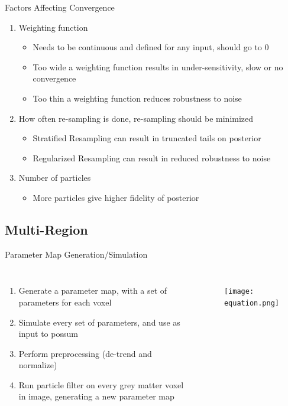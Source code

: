 \documentclass{beamer}
\begin{document}
\begin{frame}{Factors Affecting Convergence}
    \begin{enumerate}
        \item Weighting function
            \begin{itemize}
                \item Needs to be continuous and defined for any input, should go to 0
                \item Too wide a weighting function results in under-sensitivity, 
                            slow or no convergence
                \item Too thin a weighting function reduces robustness to noise
            \end{itemize}
        \item How often re-sampling is done, re-sampling should be minimized
            \begin{itemize}
                \item Stratified Resampling can result in truncated tails on posterior
                \item Regularized Resampling can result in reduced robustness to noise 
            \end{itemize}
        \item Number of particles
            \begin{itemize}
                \item More particles give higher fidelity of posterior
            \end{itemize}
    \end{enumerate}
\end{frame}

\subsection{Multi-Region}
\begin{frame}{Parameter Map Generation/Simulation}
\begin{columns}
  \column{2.5in}
  \begin{enumerate}
    \item Generate a parameter map, with a set of parameters for each voxel
    \item Simulate every set of parameters, and use as input to possum
    \item Perform preprocessing (de-trend and normalize)
    \item Run particle filter on every grey matter voxel in image, generating a new
            parameter map
  \end{enumerate}
  \column{3in}
  \begin{figure}
    \texttt{[image: equation.png]}
    \caption{
    }
  \end{figure}
\end{columns}
\end{frame}
\end{document}
